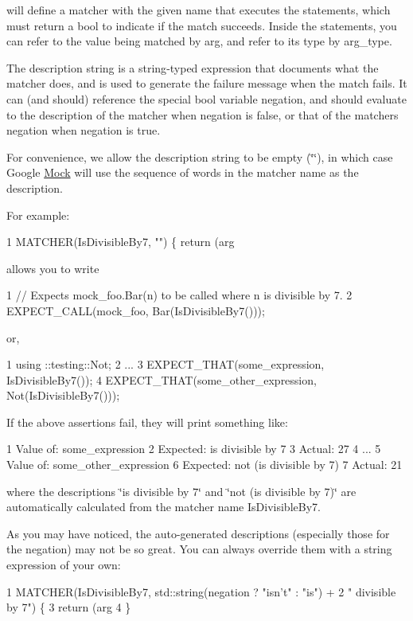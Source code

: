 will define a matcher with the given name that executes the statements, which must return a {\ttfamily bool} to indicate if the match succeeds. Inside the statements, you can refer to the value being matched by {\ttfamily arg}, and refer to its type by {\ttfamily arg\+\_\+type}.

The description string is a {\ttfamily string}-\/typed expression that documents what the matcher does, and is used to generate the failure message when the match fails. It can (and should) reference the special {\ttfamily bool} variable {\ttfamily negation}, and should evaluate to the description of the matcher when {\ttfamily negation} is {\ttfamily false}, or that of the matcher\textquotesingle{}s negation when {\ttfamily negation} is {\ttfamily true}.

For convenience, we allow the description string to be empty ({\ttfamily \char`\"{}\char`\"{}}), in which case Google \hyperlink{class_mock}{Mock} will use the sequence of words in the matcher name as the description.

For example\+: 
\begin{DoxyCode}
1 MATCHER(IsDivisibleBy7, "") \{ return (arg %
\end{DoxyCode}
 allows you to write 
\begin{DoxyCode}
1 // Expects mock\_foo.Bar(n) to be called where n is divisible by 7.
2 EXPECT\_CALL(mock\_foo, Bar(IsDivisibleBy7()));
\end{DoxyCode}
 or, 
\begin{DoxyCode}
1 using ::testing::Not;
2 ...
3   EXPECT\_THAT(some\_expression, IsDivisibleBy7());
4   EXPECT\_THAT(some\_other\_expression, Not(IsDivisibleBy7()));
\end{DoxyCode}
 If the above assertions fail, they will print something like\+: 
\begin{DoxyCode}
1   Value of: some\_expression
2   Expected: is divisible by 7
3     Actual: 27
4 ...
5   Value of: some\_other\_expression
6   Expected: not (is divisible by 7)
7     Actual: 21
\end{DoxyCode}
 where the descriptions {\ttfamily \char`\"{}is divisible by 7\char`\"{}} and {\ttfamily \char`\"{}not (is divisible
by 7)\char`\"{}} are automatically calculated from the matcher name {\ttfamily Is\+Divisible\+By7}.

As you may have noticed, the auto-\/generated descriptions (especially those for the negation) may not be so great. You can always override them with a string expression of your own\+: 
\begin{DoxyCode}
1 MATCHER(IsDivisibleBy7, std::string(negation ? "isn't" : "is") +
2                         " divisible by 7") \{
3   return (arg %
4 \}
\end{DoxyCode}


